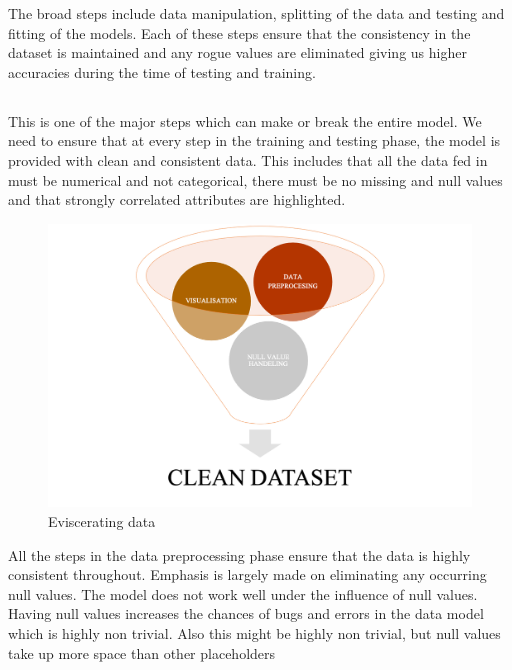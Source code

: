 \documentclass[12pt]{article}
\newcommand{\nd}{\noindent}
\newcommand{\subsize}{\fontsize{14pt}{12pt}\selectfont}
\begin{document}
\nd The broad steps include data manipulation, splitting of the data and testing and fitting of the models. Each of these steps ensure that the consistency in the dataset is maintained and any rogue values are eliminated giving us higher accuracies during the time of testing and training. 

\newpage 

\subsection{\textbf{\subsize{DATA CLEANING}}}
This is one of the major steps which can make or break the entire model. We need to ensure that at every step in the training and testing phase, the model is provided with clean and consistent data. This includes that all the data fed in must be numerical and not categorical, there must be no missing and null values and that strongly correlated attributes are highlighted. 


\begin{center}
\begin{figure}[h]
\centerline{\includegraphics[scale=.55]{datacleaning.png}}
\caption{Eviscerating data }
\end{figure}
\end{center}

\nd All the steps in the data preprocessing phase ensure that the data is highly consistent throughout. Emphasis is largely made on eliminating any occurring null values. The model does not work well under the influence of null values. Having null values increases the chances of bugs and errors in the data model which is highly non trivial. Also this might be highly non trivial, but null values take up more space than other placeholders
\end{document}
